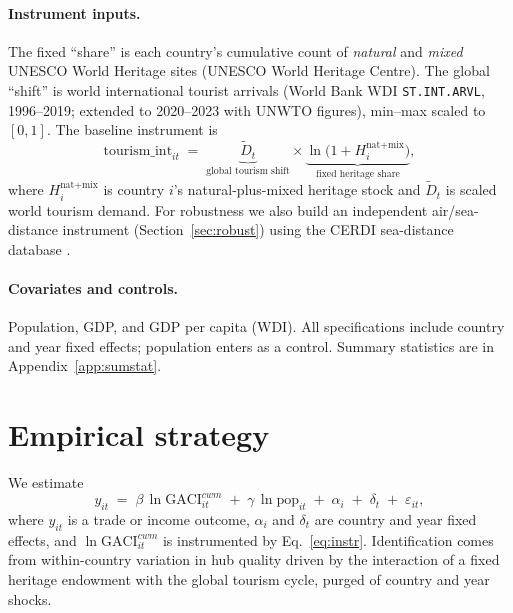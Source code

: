 \documentclass[review,3p,times]{elsarticle}
\begin{document}
\paragraph{Instrument inputs.} The fixed ``share'' is each country's cumulative
count of \emph{natural} and \emph{mixed} UNESCO World Heritage sites (UNESCO
World Heritage Centre). The global ``shift'' is world international tourist
arrivals (World Bank WDI \texttt{ST.INT.ARVL}, 1996--2019; extended to
2020--2023 with UNWTO figures), min--max scaled to $[0,1]$. The baseline
instrument is
\begin{equation}
\text{tourism\_int}_{it} \;=\; \underbrace{\widetilde{D}_t}_{\text{global tourism shift}}
\times \underbrace{\ln\!\bigl(1+H_i^{\text{nat+mix}}\bigr)}_{\text{fixed heritage share}},
\label{eq:instr}
\end{equation}
where $H_i^{\text{nat+mix}}$ is country $i$'s natural-plus-mixed heritage stock
and $\widetilde{D}_t$ is scaled world tourism demand. For robustness we also
build an independent air/sea-distance instrument (Section~\ref{sec:robust})
using the CERDI sea-distance database \citep{Bertoli_2016}.

\paragraph{Covariates and controls.} Population, GDP, and GDP per capita (WDI).
All specifications include country and year fixed effects; population enters as
a control. Summary statistics are in Appendix~\ref{app:sumstat}.

\section{Empirical strategy}
We estimate
\begin{equation}
y_{it} \;=\; \beta\,\ln\text{GACI}^{cwm}_{it} \;+\; \gamma\,\ln\text{pop}_{it}
\;+\; \alpha_i \;+\; \delta_t \;+\; \varepsilon_{it},
\label{eq:main}
\end{equation}
where $y_{it}$ is a trade or income outcome, $\alpha_i$ and $\delta_t$ are
country and year fixed effects, and $\ln\text{GACI}^{cwm}_{it}$ is instrumented
by Eq.~\eqref{eq:instr}. Identification comes from within-country variation in
hub quality driven by the interaction of a fixed heritage endowment with the
global tourism cycle, purged of country and year shocks.
\end{document}
